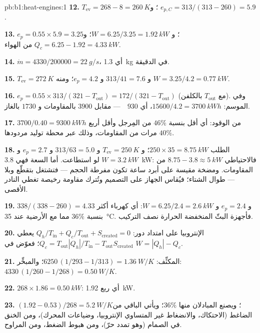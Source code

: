 \begin{solution}{pb:b1:heat-engines:1}
\textbf{12.} $T_{\mathrm{ev}} = 268 - 8 = \qty{260}{K}$؛ و $e_{p,C} = 313/(313 - 260)
= 5.9$.

\textbf{13.} $e_p = 0.55 \times 5.9 = 3.25$؛ و $W = 6.25/3.25 = \qty{1.92}{kW}$؛
و $Q_c = 6.25 - 1.92 = \qty{4.33}{kW}$ من الهواء.

\textbf{14.} $\dot m = 4330/200000 = \qty{22}{g/s}$، أي \qty{1.3}{kg} في الدقيقة.

\textbf{15.} $T_{\mathrm{ev}} = \qty{272}{K}$ و $313/41 = 7.6$ و $e_p = 4.2$؛
ومنه $W = 3.25/4.2 = \qty{0.77}{kW}$.

\textbf{16.} $e_p = 0.55 \times 313/(321 - T_{\mathrm{out}}) = 172/(321 -
T_{\mathrm{out}})$ (مع $T_{\mathrm{out}}$ بالكلفن). وفي الموسم: $15600/4.2 =
\qty{3700}{kW h}$، أي $930$~\texteuro\ --- مقابل $3900$ بالمقاومات و
$1730$ بالغاز.

\textbf{17.} $3700/0.40 = \qty{9300}{kW h}$ من الوقود: أي أقل بنسبة $46\%$ من
المِرجل وأقل أربع مرات من المقاومات، وذلك عبر محطة توليد
مردودها $40\%$.

\textbf{18.} الطلب $250 \times 35 = \qty{8.75}{kW}$؛ و $T_{\mathrm{ev}} = \qty{250}{K}$
و $313/63 = 5.0$ و $e_p = 2.7$ و $W = \qty{3.2}{kW}$ لو استطاعت. أما السعة فهي
\qty{3.8}{kW}: فالاحتياطي $8.75 - 3.8 \approx \qty{5}{kW}$ من المقاومات. ومضخة
مقيسة على أبرد ساعة تكون مفرطة الحجم --- فتشتغل بتقطّع
وبلا  --- طوال الشتاء؛ فيُقاس الجهاز على  التصميم
وتُترك مقاومة رخيصة تغطي النادر الأقصى.

\textbf{19.} $338/(338 - 260) = 4.33$ و $e_p = 2.4$ و $W = 6.25/2.4 =
\qty{2.6}{kW}$: أي كهرباء أكثر بنسبة $36\%$ مما مع الأرضية عند
\qty{35}{\degreeCelsius}. فأجهزة البثّ المنخفضة الحرارة نصف
التركيب.

\textbf{20.} الإنتروبيا على امتداد دور: $Q_h/T_{\mathrm{in}} + Q_c/T_{\mathrm{out}} +
S_{\mathrm{created}} = 0$ يعطي $Q_c = T_{\mathrm{out}}|Q_h|/T_{\mathrm{in}} -
T_{\mathrm{out}}S_{\mathrm{created}}$؛ فعوّض في $W = |Q_h| - Q_c$.

\textbf{21.} المكثِّف: $6250\,(1/293 - 1/313) = \qty{1.36}{W/K}$؛ والمبخِّر:
$4330\,(1/260 - 1/268) = \qty{0.50}{W/K}$.

\textbf{22.} $268 \times 1.86 = \qty{0.50}{kW}$: أي ربع
\qty{1.92}{kW}.

\textbf{23.} $(1.92 - 0.53)/268 = \qty{5.2}{W/K}$؛ ويصنع المبادلان منها
$36\%$؛ ويأتي الباقي من الضاغط (الاحتكاك، والانضغاط غير
المتساوي الإنتروبيا، وضياعات المحرك)، ومن الخنق في الصمام (وهو تمدد
حرّ)، ومن هبوط الضغط، ومن المراوح.


\end{solution}
